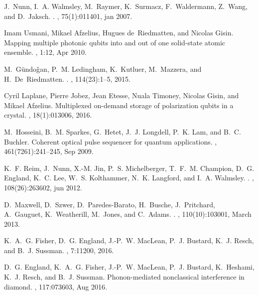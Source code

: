 \documentclass[%
 reprint,
 amsmath,amssymb,
 aps,
 pra,
]{revtex4-1}
\begin{document}
\begin{thebibliography}{10}
J.~Nunn, I.~A. Walmsley, M.~Raymer, K.~Surmacz, F.~Waldermann, Z.~Wang, and
  D.~Jaksch.
.
, 75(1):011401, jan 2007.

Imam Usmani, Mikael Afzelius, Hugues de~Riedmatten, and Nicolas Gisin.
\newblock Mapping multiple photonic qubits into and out of one solid-state
  atomic ensemble.
, 1:12, Apr 2010.

M.~G{\"u}ndo{\v g}an, P.~M. Ledingham, K.~Kutluer, M.~Mazzera, and
  H.~De~Riedmatten.
.
, 114(23):1--5, 2015.

Cyril Laplane, Pierre Jobez, Jean Etesse, Nuala Timoney, Nicolas Gisin, and
  Mikael Afzelius.
\newblock Multiplexed on-demand storage of polarization qubits in a crystal.
, 18(1):013006, 2016.

M.~Hosseini, B.~M. Sparkes, G.~Hetet, J.~J. Longdell, P.~K. Lam, and B.~C.
  Buchler.
\newblock Coherent optical pulse sequencer for quantum applications.
, 461(7261):241--245, Sep 2009.

K.~F. Reim, J.~Nunn, X.-M. Jin, P.~S. Michelberger, T.~F.~M. Champion, D.~G.
  England, K.~C. Lee, W.~S. Kolthammer, N.~K. Langford, and I.~A. Walmsley.
.
, 108(26):263602, jun 2012.

D.~Maxwell, D.~Szwer, D.~Paredes-Barato, H.~Busche, J.~Pritchard, A.~Gauguet,
  K.~Weatherill, M.~Jones, and C.~Adams.
.
, 110(10):103001, March 2013.

K.~A.~G. Fisher, D.~G. England, J.-P.~W. MacLean, P.~J. Bustard, K.~J. Resch,
  and B.~J. Sussman.
, 7:11200, 2016.

D.~G. England, K.~A.~G. Fisher, J.-P.~W. MacLean, P.~J. Bustard, K.~Heshami,
  K.~J. Resch, and B.~J. Sussman.
\newblock Phonon-mediated nonclassical interference in diamond.
, 117:073603, Aug 2016.


\end{thebibliography}
\end{document}
